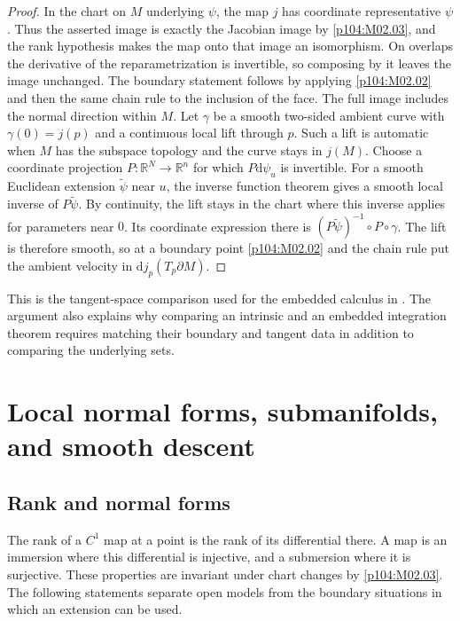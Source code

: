 \documentclass[11pt,oneside,openany]{book}
\theoremstyle{definition}
\theoremstyle{remark}
\newcommand{\R}{\mathbb R}
\newcommand{\dd}{\mathrm d}
\begin{document}
\begin{proof}
In the chart on \(M\) underlying \(\psi\), the map \(j\)
has coordinate representative \(\psi\). Thus the asserted
image is exactly the Jacobian image by
\cref{p104:M02.03}, and the rank hypothesis makes the
map onto that image an isomorphism. On overlaps the
derivative of the reparametrization is invertible, so
composing by it leaves the image unchanged. The boundary
statement follows by applying \cref{p104:M02.02} and
then the same chain rule to the inclusion of the face.
The full image includes the normal direction within \(M\).
Let \(\gamma\) be a smooth two-sided ambient curve with
\(\gamma(0)=j(p)\) and a continuous local lift through \(p\).
Such a lift is automatic when \(M\) has the subspace topology
and the curve stays in \(j(M)\). Choose a coordinate projection
\(P:\R^N\to\R^n\) for which \(P\dd\psi_u\) is invertible.
For a smooth Euclidean extension \(\widetilde\psi\) near \(u\),
the inverse function theorem gives a smooth local inverse of
\(P\widetilde\psi\). By continuity, the lift stays in the
chart where this inverse applies for parameters near \(0\).
Its coordinate expression there is
\((P\widetilde\psi)^{-1}\circ P\circ\gamma\). The lift is
therefore smooth, so at a boundary point \cref{p104:M02.02}
and the chain rule put the ambient
velocity in \(\dd j_p(T_p\partial M)\).
\end{proof}

This is the tangent-space comparison used for the
embedded calculus in \cite[Chapter~14]{d04}. The argument
also explains why comparing an intrinsic and an embedded
integration theorem requires matching their boundary and
tangent data in addition to comparing the underlying sets.
\chapter{Local normal forms, submanifolds, and smooth descent}

\section{Rank and normal forms}

The rank of a \(C^1\) map at a point is the rank of its
differential there. A map is an immersion where this
differential is injective, and a submersion where it is
surjective. These properties are invariant under chart
changes by \cref{p104:M02.03}. The following statements
separate open models from the boundary situations in which
an extension can be used.
\end{document}
